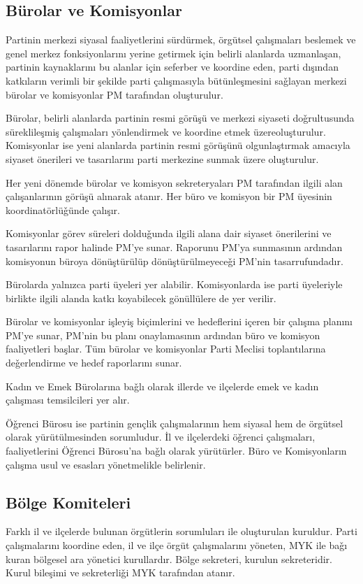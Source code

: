 \documentclass[11pt]{article} %
\begin{document}
\subsection{Bürolar ve Komisyonlar}
Partinin merkezi siyasal faaliyetlerini sürdürmek, örgütsel çalışmaları beslemek ve genel merkez fonksiyonlarını yerine getirmek için belirli alanlarda uzmanlaşan, partinin kaynaklarını bu alanlar için seferber ve koordine eden, parti dışından katkıların verimli bir şekilde parti çalışmasıyla bütünleşmesini saǧlayan merkezi bürolar ve komisyonlar PM tarafından oluşturulur.

Bürolar, belirli alanlarda partinin resmi görüşü ve merkezi siyaseti doǧrultusunda süreklileşmiş çalışmaları yönlendirmek ve koordine etmek üzereoluşturulur. Komisyonlar ise yeni alanlarda partinin resmi görüşünü olgunlaştırmak amacıyla siyaset önerileri ve tasarılarını parti merkezine sunmak üzere oluşturulur.

Her yeni dönemde bürolar ve komisyon sekreteryaları PM tarafından ilgili alan çalışanlarının görüşü alınarak atanır. Her büro ve komisyon bir PM üyesinin koordinatörlüǧünde çalışır. 

Komisyonlar görev süreleri dolduǧunda ilgili alana dair siyaset önerilerini ve tasarılarını rapor halinde PM’ye sunar. Raporunu PM’ya sunmasının ardından komisyonun büroya dönüştürülüp dönüştürülmeyeceǧi PM’nin tasarrufundadır.

Bürolarda yalnızca parti üyeleri yer alabilir. Komisyonlarda ise parti üyeleriyle
birlikte ilgili alanda katkı koyabilecek gönüllülere de yer verilir.

Bürolar ve komisyonlar işleyiş biçimlerini ve hedeflerini içeren bir çalışma planını PM’ye sunar, PM’nin bu planı onaylamasının ardından büro ve komisyon faaliyetleri başlar. Tüm bürolar ve komisyonlar Parti Meclisi toplantılarına deǧerlendirme ve hedef raporlarını sunar.

Kadın ve Emek Bürolarına baǧlı olarak illerde ve ilçelerde emek ve kadın çalışması
temsilcileri yer alır.

Öǧrenci Bürosu ise partinin gençlik çalışmalarının hem siyasal hem de örgütsel olarak yürütülmesinden sorumludur. İl ve ilçelerdeki öǧrenci çalışmaları, faaliyetlerini Öǧrenci Bürosu’na baǧlı olarak yürütürler.
Büro ve Komisyonların çalışma usul ve esasları yönetmelikle belirlenir.

\subsection{Bölge Komiteleri}
Farklı il ve ilçelerde bulunan örgütlerin sorumluları ile oluşturulan kuruldur. Parti
çalışmalarını koordine eden, il ve ilçe örgüt çalışmalarını yöneten, MYK ile baǧı kuran bölgesel ara yönetici kurullardır. Bölge sekreteri, kurulun sekreteridir. Kurul bileşimi ve sekreterliǧi MYK tarafından atanır.
\end{document}
